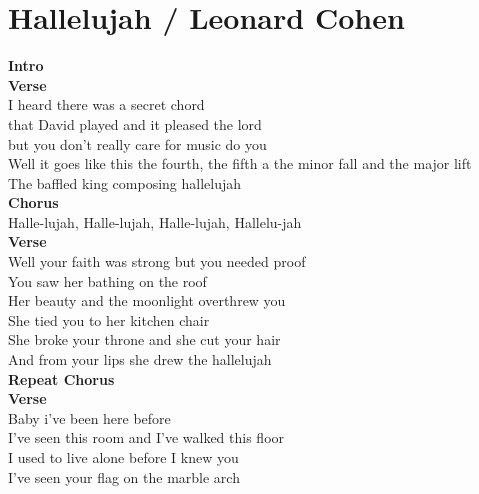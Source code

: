 \section{Hallelujah / Leonard Cohen}\label{sec:hallelujah}
\Cmajor
\Fmajor
\Gmajor
\Aminor
\Eseven

\textbf{Intro}    \\
\textbf{Verse}\\
I heard there was a secret chord\\
that David played and it pleased the lord\\
but you don't really care for music do you \\
Well it goes like this the fourth, the fifth a the minor fall and the major lift \\
The baffled king composing hallelujah\\
\textbf{Chorus}\\
Halle-lujah, Halle-lujah, Halle-lujah, Hallelu-jah    \\
\textbf{Verse}\\
Well your faith was strong but you needed proof\\
You saw her bathing on the roof\\
Her beauty and the moonlight overthrew you \\
She tied you to her kitchen chair\\
She broke your throne and she cut your hair \\
And from your lips she drew the hallelujah\\
\textbf{Repeat Chorus}\\
\textbf{Verse}\\
Baby i've been here before\\
I've seen this room and I've walked this floor\\
I used to live alone before I knew you \\
I've seen your flag on the marble arch\\
